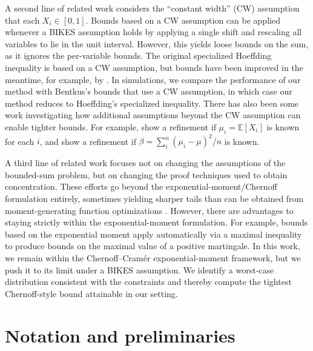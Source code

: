\documentclass[12pt]{article}
\theoremstyle{plain}
\begin{document}
A second line of related work considers the ``constant width'' (CW) assumption that each $X_i \in [0,1]$.  Bounds based on a CW assumption can be applied whenever a BIKES assumption holds by applying a single shift and rescaling all variables to lie in the unit interval.  However, this yields loose bounds on the sum, as it ignores the per-variable bounds.  The original specialized Hoeffding inequality is based on a CW assumption, but bounds have been improved in the meantime, for example, by \citet[Theorem 1.2]{bentkus2004hoeffding}.  In simulations, we compare the performance of our method with Bentkus's bounds that use a CW assumption, in which case our method reduces to Hoeffding's specialized inequality.  There has also been some work investigating how additional assumptions beyond the CW assumption can enable tighter bounds.  For example, \citet{from2013refinement} show a refinement if $\mu_i=\mathbb{E}[X_i]$ is known for each $i$, and \citet{from2023improved} show a refinement if $\beta = \sum_i^n (\mu_i-\mu)^2/n$ is known.

A third line of related work focuses not on changing the assumptions of the bounded-sum problem, but on changing the proof techniques used to obtain concentration.  These efforts go beyond the exponential-moment/Chernoff formulation entirely, sometimes yielding sharper tails than can be obtained from moment-generating function optimizations \citep[cf.][]{talagrand1995missing, bentkus2002remark, pinelis2006inequalities}.  However, there are advantages to staying strictly within the exponential-moment formulation.  For example, bounds based on the exponential moment apply automatically via a maximal inequality to produce bounds on the maximal value of a positive martingale.  In this work, we remain within the Chernoff–Cramér exponential-moment framework, but we push it to its limit under a BIKES assumption.  We identify a worst-case distribution consistent with the constraints and thereby compute the tightest Chernoff-style bound attainable in our setting.


\section{Notation and preliminaries}

\label{sec:notation}
\end{document}
